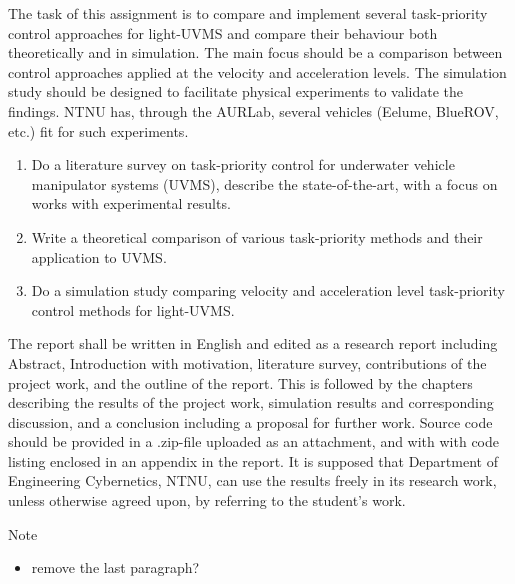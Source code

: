 The task of this assignment is to compare and implement several task-priority control
approaches for light-UVMS and compare their behaviour both theoretically and in simulation.
The main focus should be a comparison between control approaches applied at the velocity and
acceleration levels. The simulation study should be designed to facilitate physical experiments
to validate the findings. NTNU has, through
the AURLab, several vehicles (Eelume, BlueROV, etc.) fit for such experiments.
\newpage
\begin{enumerate}
\item Do a literature survey on task-priority control for underwater vehicle manipulator
systems (UVMS), describe the state-of-the-art, with a focus on works with experimental
results.
\item Write a theoretical comparison of various task-priority methods and their application to
UVMS.
\item Do a simulation study comparing velocity and acceleration level task-priority control
methods for light-UVMS.
\end{enumerate}
The report shall be written in English and edited as a research report including Abstract,
Introduction with motivation, literature survey, contributions of the project work, and the outline
of the report. This is followed by the chapters describing the results of the project work,
simulation results and corresponding discussion, and a conclusion including a proposal for
further work. Source code should be provided in a .zip-file uploaded as an attachment, and with
with code listing enclosed in an appendix in the report. It is supposed that Department of
Engineering Cybernetics, NTNU, can use the results freely in its research work, unless otherwise
agreed upon, by referring to the student’s work.

{
    \color{red}
    Note
    \begin{itemize}
       \item remove the last paragraph?
    \end{itemize}
}
